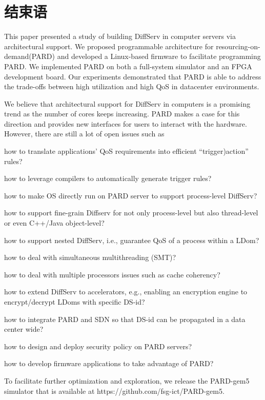

\chapter{结束语}
\label{cha:concl}

This paper presented a study of building DiffServ in computer
servers via architectural support. We proposed programmable
architecture for resourcing-on-demand(PARD) and developed a
Linux-based firmware to facilitate programming PARD. We implemented
PARD on both a full-system simulator and an FPGA
development board. Our experiments demonstrated that PARD is
able to address the trade-offs between high utilization and high
QoS in datacenter environments.

We believe that architectural support for DiffServ in computers
is a promising trend as the number of cores keeps increasing. PARD
makes a case for this direction and provides new interfaces for users
to interact with the hardware. However, there are still a lot of open
issues such as

how to translate applications’ QoS requirements into efficient
“trigger)action” rules?

how to leverage compilers to automatically generate trigger
rules?

how to make OS directly run on PARD server to support
process-level DiffServ?

how to support fine-grain Diffserv for not only process-level but
also thread-level or even C++/Java object-level?

how to support nested DiffServ, i.e., guarantee QoS of a process
within a LDom?
 
how to deal with simultaneous multithreading (SMT)?
 
how to deal with multiple processors issues such as cache coherency?

how to extend DiffServ to accelerators, e.g., enabling an encryption
engine to encrypt/decrypt LDoms with specific DS-id?

how to integrate PARD and SDN so that DS-id can be propagated
in a data center wide?

how to design and deploy security policy on PARD servers?

how to develop firmware applications to take advantage of
PARD?

To facilitate further optimization and exploration, we
release the PARD-gem5 simulator that is available at
https://github.com/fsg-ict/PARD-gem5.


